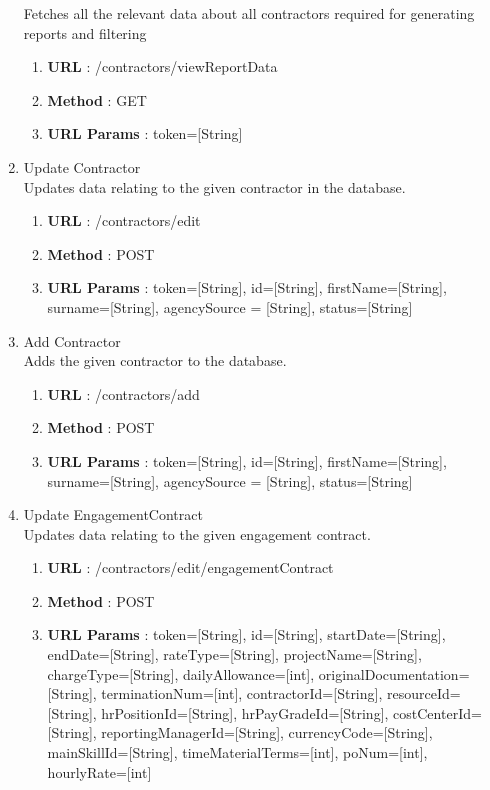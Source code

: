 \documentclass[11pt, titlepage]{article}
\begin{document}
\begin{enumerate}
             Fetches all the relevant data about all contractors required for generating reports and filtering
                \begin{enumerate}
                    \item \textbf{URL} : /contractors/viewReportData
                    \item \textbf{Method} : GET
                    \item \textbf{URL Params} : token=[String]
                \end{enumerate}
        \item Update Contractor \\
             Updates data relating to the given contractor in the database. 
                \begin{enumerate}
                    \item \textbf{URL} : /contractors/edit
                    \item \textbf{Method} : POST
                    \item \textbf{URL Params} : token=[String], id=[String], firstName=[String], surname=[String], agencySource = [String], status=[String]
                \end{enumerate}
        \item Add Contractor \\ 
             Adds the given contractor to the database. 
                \begin{enumerate}
                    \item \textbf{URL} : /contractors/add
                    \item \textbf{Method} : POST
                    \item \textbf{URL Params} : token=[String], id=[String], firstName=[String], surname=[String], agencySource = [String], status=[String]
                \end{enumerate}
        \item Update EngagementContract \\ 
             Updates data relating to the given engagement contract.
                \begin{enumerate}
                    \item \textbf{URL} : /contractors/edit/engagementContract
                    \item \textbf{Method} : POST
                    \item \textbf{URL Params} : token=[String], id=[String], startDate=[String], endDate=[String], rateType=[String], projectName=[String], chargeType=[String], dailyAllowance=[int], originalDocumentation=[String], terminationNum=[int], contractorId=[String], resourceId=[String], hrPositionId=[String], hrPayGradeId=[String], costCenterId=[String], reportingManagerId=[String], currencyCode=[String], mainSkillId=[String], timeMaterialTerms=[int], poNum=[int], hourlyRate=[int]

\end{enumerate}
\end{enumerate}
\end{document}
